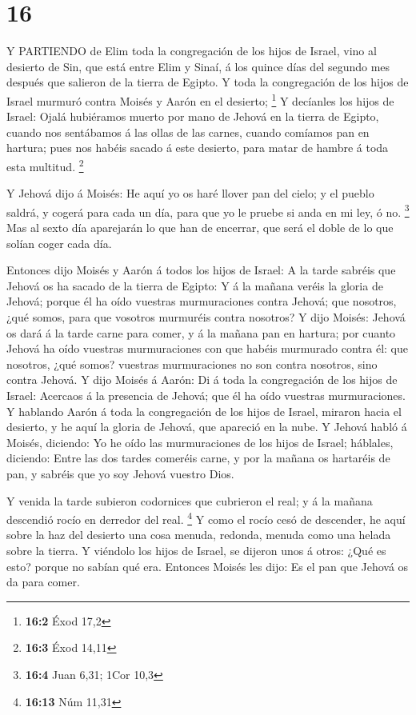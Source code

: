 \hypertarget{section-15}{%
\section{16}\label{section-15}}

 Y PARTIENDO de Elim toda la congregación de los hijos de
Israel, vino al desierto de Sin, que está entre Elim y Sinaí, á los
quince días del segundo mes después que salieron de la tierra de Egipto.
 Y toda la congregación de los hijos de Israel murmuró
contra Moisés y Aarón en el desierto; \footnote{\textbf{16:2} Éxod 17,2}
 Y decíanles los hijos de Israel: Ojalá hubiéramos muerto
por mano de Jehová en la tierra de Egipto, cuando nos sentábamos á las
ollas de las carnes, cuando comíamos pan en hartura; pues nos habéis
sacado á este desierto, para matar de hambre á toda esta multitud.
\footnote{\textbf{16:3} Éxod 14,11}

 Y Jehová dijo á Moisés: He aquí yo os haré llover pan del
cielo; y el pueblo saldrá, y cogerá para cada un día, para que yo le
pruebe si anda en mi ley, ó no. \footnote{\textbf{16:4} Juan 6,31; 1Cor
  10,3}  Mas al sexto día aparejarán lo que han de encerrar,
que será el doble de lo que solían coger cada día.

 Entonces dijo Moisés y Aarón á todos los hijos de Israel: A
la tarde sabréis que Jehová os ha sacado de la tierra de Egipto:
 Y á la mañana veréis la gloria de Jehová; porque él ha oído
vuestras murmuraciones contra Jehová; que nosotros, ¿qué somos, para que
vosotros murmuréis contra nosotros?  Y dijo Moisés: Jehová
os dará á la tarde carne para comer, y á la mañana pan en hartura; por
cuanto Jehová ha oído vuestras murmuraciones con que habéis murmurado
contra él: que nosotros, ¿qué somos? vuestras murmuraciones no son
contra nosotros, sino contra Jehová.  Y dijo Moisés á Aarón:
Di á toda la congregación de los hijos de Israel: Acercaos á la
presencia de Jehová; que él ha oído vuestras murmuraciones.
 Y hablando Aarón á toda la congregación de los hijos de
Israel, miraron hacia el desierto, y he aquí la gloria de Jehová, que
apareció en la nube.  Y Jehová habló á Moisés, diciendo:
 Yo he oído las murmuraciones de los hijos de Israel;
háblales, diciendo: Entre las dos tardes comeréis carne, y por la mañana
os hartaréis de pan, y sabréis que yo soy Jehová vuestro Dios.

 Y venida la tarde subieron codornices que cubrieron el
real; y á la mañana descendió rocío en derredor del real. \footnote{\textbf{16:13}
  Núm 11,31}  Y como el rocío cesó de descender, he aquí
sobre la haz del desierto una cosa menuda, redonda, menuda como una
helada sobre la tierra.  Y viéndolo los hijos de Israel, se
dijeron unos á otros: ¿Qué es esto? porque no sabían qué era. Entonces
Moisés les dijo: Es el pan que Jehová os da para comer.

